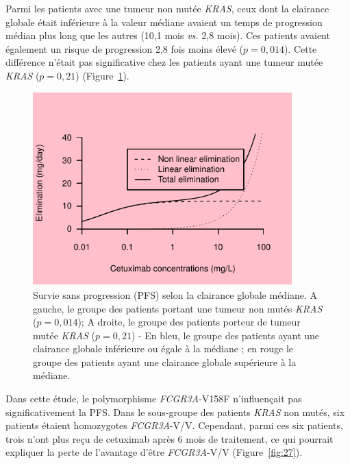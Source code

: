 Parmi les patients avec une tumeur non mutée \textit{KRAS}, ceux dont la clairance globale était inférieure à la valeur médiane avaient un temps de progression médian plus long que les autres (10,1 mois \textit{vs.} 2,8 mois). Ces patients avaient également un risque de progression 2,8 fois moins élevé ($p = 0,014$). Cette différence n'était pas significative chez les patients ayant une tumeur mutée \textit{KRAS} ($p = 0,21$) (Figure~\ref{fig:26}).
\begin{figure}[htbp]
	\centering
		\includegraphics[width=10cm]{images/essai001.pdf}
	\caption{Survie sans progression (PFS) selon la clairance globale médiane. A gauche, le groupe des patients portant une tumeur non mutés \textit{KRAS} ($p = 0,014$); A droite, le groupe des patients porteur de tumeur mutée \textit{KRAS} ($p = 0,21$) - En bleu, le groupe des patients ayant une clairance globale inférieure ou égale à la médiane ; en rouge le groupe des patients ayant une clairance globale supérieure à la médiane.}
	\label{fig:26}
\end{figure} 
Dans cette étude, le polymorphisme \textit{FCGR3A}-V158F n'influençait pas significativement la PFS. Dans le sous-groupe des patients \textit{KRAS} non mutés, six patients étaient homozygotes \textit{FCGR3A}-V/V. Cependant, parmi ces six patients, trois n'ont plus reçu de cetuximab après 6 mois de traitement, ce qui pourrait expliquer la perte de l'avantage d'être \textit{FCGR3A}-V/V (Figure~\ref{fig:27}). 
